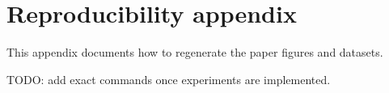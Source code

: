 \section{Reproducibility appendix}

This appendix documents how to regenerate the paper figures and datasets.

TODO: add exact commands once experiments are implemented.
